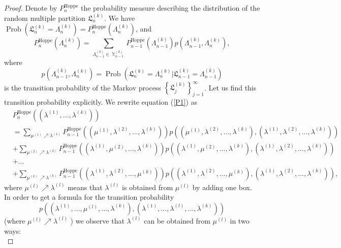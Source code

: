 \documentclass[10pt,a4paper]{amsart}
\DeclareMathOperator{\Hoppe}{Hoppe}
\DeclareMathOperator{\Prob}{Prob}
\DeclareMathOperator{\Y}{\mathbb{Y}}
\begin{document}
\begin{proof}
Denote by $P_{n}^{\Hoppe}$ the probability measure describing the distribution of the random multiple
partition $\mathfrak{L}_n^{(k)}$. We have $\Prob\left(\mathfrak{L}_n^{(k)}=\Lambda_n^{(k)}\right)=P_n^{\Hoppe}(\Lambda_n^{(k)})$, and
\begin{equation}\label{P1}
P_n^{\Hoppe}\left(\Lambda_n^{(k)}\right)=\sum\limits_{\Lambda_{n-1}^{(k)}\in\Y_{n-1}^{(k)}}
P^{\Hoppe}_{n-1}\left(\Lambda_{n-1}^{(k)}\right)p\left(\Lambda_{n-1}^{(k)},\Lambda_n^{(k)}\right),
\end{equation}
where
$$
p\left(\Lambda_{n-1}^{(k)},\Lambda_n^{(k)}\right)
=\Prob\left(\mathfrak{L}_n^{(k)}=\Lambda_n^{(k)}|\mathfrak{L}_{n-1}^{(k)}=\Lambda_{n-1}^{(k)}\right)
$$
is the transition probability of the Markov process $\left\{\mathfrak{L}_j^{(k)}\right\}_{j=1}^{\infty}$. Let us find this transition probability explicitly.
We rewrite equation (\ref{P1}) as
\begin{equation}
\begin{split}
&P^{\Hoppe}_n\left(\left(\lambda^{(1)},\ldots,\lambda^{(k)}\right)\right)\\
&=\sum\limits_{\mu^{(1)}\nearrow\lambda^{(1)}}P_{n-1}^{\Hoppe}\left(\left(\mu^{(1)},\lambda^{(2)},\ldots,\lambda^{(k)}\right)\right)
p\left(\left(\mu^{(1)},\lambda^{(2)},\ldots,\lambda^{(k)}\right),\left(\lambda^{(1)},\lambda^{(2)},\ldots,\lambda^{(k)}\right)\right)\\
&+\sum\limits_{\mu^{(2)}\nearrow\lambda^{(2)}}P_{n-1}^{\Hoppe}\left(\left(\lambda^{(1)},\mu^{(2)},\ldots,\lambda^{(k)}\right)\right)
p\left(\left(\lambda^{(1)},\mu^{(2)},\ldots,\lambda^{(k)}\right),\left(\lambda^{(1)},\lambda^{(2)},\ldots,\lambda^{(k)}\right)\right)\\
&+\ldots\\
&+\sum\limits_{\mu^{(k)}\nearrow\lambda^{(k)}}P_{n-1}^{\Hoppe}\left(\left(\lambda^{(1)},\lambda^{(2)},\ldots,\mu^{(k)}\right)\right)
p\left(\left(\lambda^{(1)},\lambda^{(2)},\ldots,\mu^{(k)}\right),\left(\lambda^{(1)},\lambda^{(2)},\ldots,\lambda^{(k)}\right)\right),
\end{split}
\end{equation}
where $\mu^{(l)}\nearrow\lambda^{(l)}$ means that $\lambda^{(l)}$ is obtained from $\mu^{(l)}$ by adding one box.
In order to get a formula for the transition probability
$$
p\left(\left(\lambda^{(1)},\ldots,\mu^{(l)},\ldots,\lambda^{(k)}\right),\left(\lambda^{(1)},\ldots,\lambda^{(l)},\ldots,\lambda^{(k)}\right)\right)
$$
(where $\mu^{(l)}\nearrow\lambda^{(l)}$ ) we observe that $\lambda^{(l)}$ can be obtained from $\mu^{(l)}$ in two ways:\\

\end{proof}
\end{document}
